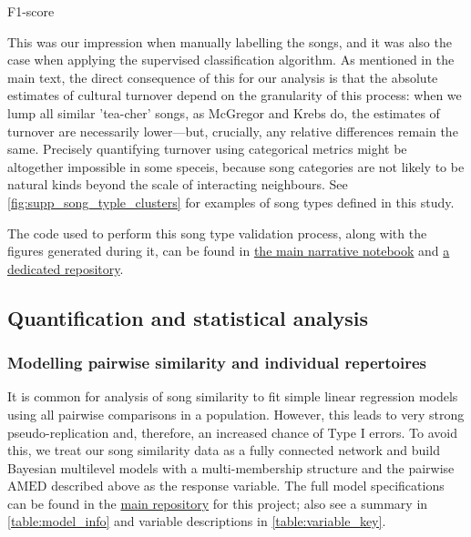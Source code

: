 \documentclass[9pt, onecolumn, twoside, lineno]{gsajnl}
\begin{document}
F1-score

This was our impression when manually labelling the songs, and it was also the case when applying the supervised classification algorithm. As mentioned in the main text, the direct consequence of this for our analysis is that the absolute estimates of cultural turnover depend on the granularity of this process: when we lump all similar 'tea-cher' songs, as McGregor and Krebs \autocite{mcgregor1982b} do, the estimates of turnover are necessarily lower---but, crucially, any relative differences remain the same. Precisely quantifying turnover using categorical metrics might be altogether impossible in some speceis, because song categories are not likely to be natural kinds beyond the scale of interacting neighbours. See \autoref{fig:supp_song_typle_clusters} for examples of song types defined in this study.

The code used to perform this song type validation process, along with the figures generated during it, can be found in \href{https://github.com/nilomr/wytham-songtype-validation/blob/main/notebooks/4_train-model.ipynb}{the main narrative notebook} and \href{https://github.com/nilomr/wytham-songtype-validation}{a dedicated repository}.

\subsection{Quantification and statistical analysis}

\subsubsection{Modelling pairwise similarity and individual repertoires}

It is common for analysis of song similarity to fit simple linear regression models using all pairwise comparisons in a population. However, this leads to very strong pseudo-replication and, therefore, an increased chance of Type I errors. To avoid this, we treat our song similarity data as a fully connected network and build Bayesian multilevel models with a multi-membership structure and the pairwise $\text{AMED}$ described above as the response variable. The full model specifications can be found in the \href{https://github.com/nilomr/birdsong-demography}{main repository} for this project; also see a summary in \autoref{table:model_info} and variable descriptions in \autoref{table:variable_key}.
\end{document}
